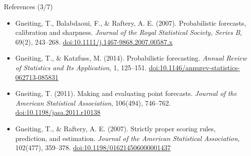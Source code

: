 \begin{frame}{References (3/7)}
\begin{itemize}
    \item Gneiting, T., Balabdaoui, F., \& Raftery, A. E. (2007). Probabilistic forecasts, calibration and sharpness. \textit{Journal of the Royal Statistical Society, Series B}, 69(2), 243--268. \href{https://doi.org/10.1111/j.1467-9868.2007.00587.x}{doi:10.1111/j.1467-9868.2007.00587.x}
    \item Gneiting, T., \& Katzfuss, M. (2014). Probabilistic forecasting. \textit{Annual Review of Statistics and Its Application}, 1, 125--151. \href{https://doi.org/10.1146/annurev-statistics-062713-085831}{doi:10.1146/annurev-statistics-062713-085831}
    \item Gneiting, T. (2011). Making and evaluating point forecasts. \textit{Journal of the American Statistical Association}, 106(494), 746--762. \href{https://doi.org/10.1198/jasa.2011.r10138}{doi:10.1198/jasa.2011.r10138}
    \item Gneiting, T., \& Raftery, A. E. (2007). Strictly proper scoring rules, prediction, and estimation. \textit{Journal of the American Statistical Association}, 102(477), 359--378. \href{https://doi.org/10.1198/016214506000001437}{doi:10.1198/016214506000001437}
\end{itemize}
\end{frame}

